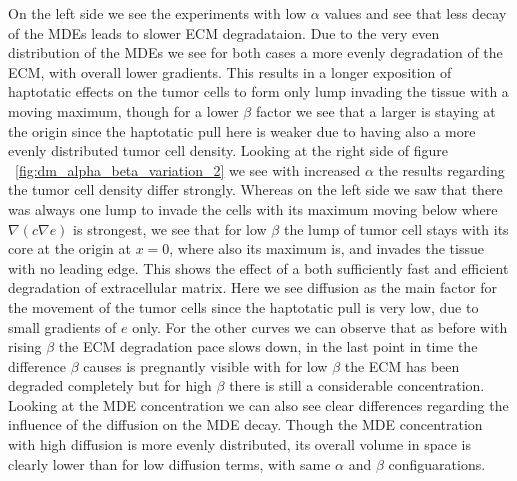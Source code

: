 On the left side we see the experiments with low $\alpha$ values and see that less decay of the MDEs leads to slower ECM degradataion. Due to the very even distribution of the MDEs we see for both cases a more evenly degradation of the ECM, with overall lower gradients. This results in a longer exposition of haptotatic effects on the tumor cells to form only lump invading the tissue with a moving maximum, though for a lower $\beta$ factor we see that a larger is staying at the origin since the haptotatic pull here is weaker due to having also a more evenly distributed tumor cell density.\newline 
Looking at the right side of figure ~\ref{fig:dm_alpha_beta_variation_2} we see with increased $\alpha$ the results regarding the tumor cell density differ strongly. Whereas on the left side we saw that there was always one lump to invade the cells with its maximum moving below where $\nabla(c\nabla e)$ is strongest, we see that for low $\beta$ the lump of tumor cell stays with its core at the origin at $x=0$, where also its maximum is, and invades the tissue with no leading edge. This shows the effect of a both sufficiently fast and efficient degradation of extracellular matrix. Here we see diffusion as the main factor for the movement of the tumor cells since the haptotatic pull is very low, due to small gradients of $e$ only. For the other curves we can observe that as before with rising $\beta$ the ECM degradation pace slows down, in the last point in time the difference $\beta$ causes is pregnantly visible with for low $\beta$ the ECM has been degraded completely but for high $\beta$ there is still a considerable concentration. Looking at the MDE concentration we can also see clear differences regarding the influence of the diffusion on the MDE decay. Though the MDE concentration with high diffusion is more evenly distributed, its overall volume in space is clearly lower than for low diffusion terms, with same $\alpha$ and $\beta$ configuarations.




